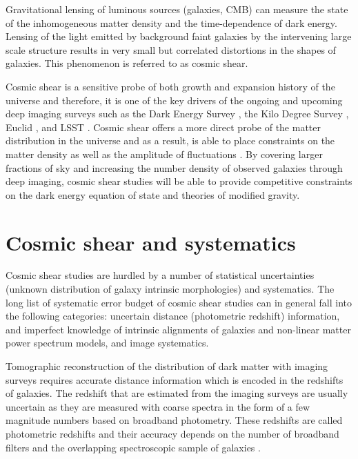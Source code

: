 Gravitational lensing of luminous sources (galaxies, CMB) can measure 
the state of the inhomogeneous matter density and the time-dependence of dark energy. 
Lensing of the light emitted by background faint galaxies by the intervening large scale structure 
results in very small but correlated distortions in the shapes of galaxies. This phenomenon is referred to 
as cosmic shear. 

Cosmic shear is a sensitive probe of both growth and expansion history of the universe and therefore, it 
is one of the key drivers of the ongoing and upcoming deep imaging surveys such as the Dark Energy Survey \citep{DES}, 
the Kilo Degree Survey \citep{hildebrandt2017}, Euclid \citep{euclid}, and LSST \citep{desc}. Cosmic shear offers a more 
direct probe of the matter distribution in the universe and as a result, is able to place constraints on the matter density 
as well as the amplitude of fluctuations \citep{heymans,abbot2016,joudaki2016,hildebrandt2017}. By covering larger fractions of 
sky and increasing the number density of observed galaxies through deep imaging, cosmic shear studies will be able to 
provide competitive constraints on the dark energy equation of state and theories of modified gravity.  

\section{Cosmic shear and systematics}

Cosmic shear studies are hurdled by a number of statistical uncertainties (unknown distribution 
of galaxy intrinsic morphologies) and systematics. The long list of systematic error budget 
of cosmic shear studies can in general fall into the following categories: uncertain distance 
(photometric redshift) information, and imperfect knowledge of intrinsic alignments of galaxies and non-linear matter 
power spectrum models, and image systematics. 

Tomographic reconstruction of the distribution of dark matter with imaging surveys requires 
accurate distance information which is encoded in the redshifts of galaxies. 
The redshift that are estimated from the imaging surveys are usually uncertain as they are measured with coarse 
spectra in the form of a few magnitude numbers based on broadband photometry. These redshifts are called 
photometric redshifts and their accuracy depends on the number of broadband filters and the overlapping spectroscopic 
sample of galaxies \citep{bonnett2016,choi2016,boris2016,hildebrandt2017}. %

